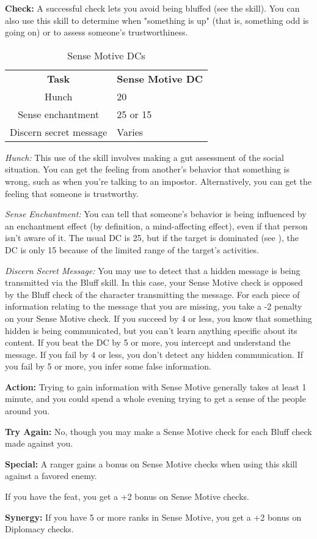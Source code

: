 
\textbf{Check:} A successful check lets you avoid being bluffed (see the  
skill). You can also use this skill to determine when "something is up" (that 
is, something odd is going on) or to assess someone's trustworthiness. 

\begin{table}[htb]
\caption{Sense Motive DCs}
\centering
\begin{tabular}{c l}
\textbf{Task} & \textbf{Sense Motive DC}\\
Hunch & 20 \\
Sense enchantment & 25 or 15\\
Discern secret message & Varies\\
\end{tabular}
\end{table}

\textit{Hunch:} This use of the skill involves making a gut assessment of the social 
situation. You can get the feeling from another's behavior that something is wrong, 
such as when you're talking to an impostor. Alternatively, you can get the feeling 
that someone is trustworthy.

\textit{Sense Enchantment:} You can tell that someone's behavior is being influenced 
by an enchantment effect (by definition, a mind-affecting effect), even 
if that person isn't aware of it. The usual DC is 25, but if the target is dominated 
(see ), the DC is only 15 because of the limited range 
of the target's activities.

\textit{Discern Secret Message:} You may use  to detect that a hidden 
message is being transmitted via the Bluff skill. In this case, your Sense Motive 
check is opposed by the Bluff check of the character transmitting the message. 
For each piece of information relating to the message that you are missing, you 
take a -2 penalty on your Sense Motive check. If you succeed by 4 or less, you 
know that something hidden is being communicated, but you can't learn anything 
specific about its content. If you beat the DC by 5 or more, you intercept and 
understand the message. If you fail by 4 or less, you don't detect any hidden communication. 
If you fail by 5 or more, you infer some false information.

\textbf{Action:} Trying to gain information with Sense Motive generally takes at 
least 1 minute, and you could spend a whole evening trying to get a sense of the 
people around you.

\textbf{Try Again:} No, though you may make a Sense Motive check for each Bluff 
check made against you.

\textbf{Special:} A ranger gains a bonus on Sense Motive checks when using this 
skill against a favored enemy.

If you have the  feat, you get a +2 bonus on Sense Motive checks.

\textbf{Synergy:} If you have 5 or more ranks in Sense Motive, you get a +2 bonus 
on Diplomacy checks.
